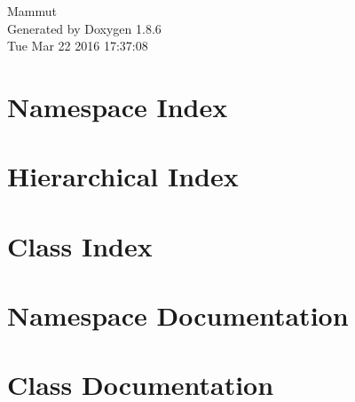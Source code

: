 \documentclass[twoside]{book}
\newcommand{\clearemptydoublepage}{%
  \newpage{\pagestyle{empty}\cleardoublepage}%
}
\begin{document}
\hypersetup{pageanchor=false}
\begin{titlepage}
\vspace*{7cm}
\begin{center}%
{\Large Mammut }\\
\vspace*{1cm}
{\large Generated by Doxygen 1.8.6}\\
\vspace*{0.5cm}
{\small Tue Mar 22 2016 17:37:08}\\
\end{center}
\end{titlepage}
\clearemptydoublepage
\tableofcontents
\clearemptydoublepage
{}
\hypersetup{pageanchor=true}

\chapter{Namespace Index}

\chapter{Hierarchical Index}

\chapter{Class Index}

\chapter{Namespace Documentation}

\chapter{Class Documentation}





















\newpage
{}
{}
\printindex
\end{document}
